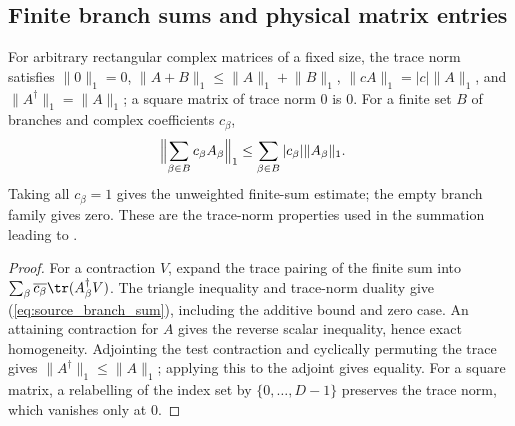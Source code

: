 \subsection{Finite branch sums and physical matrix entries}

\begin{theorem}
    \label{thm:source_branch_sum}
    \leanok
    For arbitrary rectangular complex matrices of a fixed size, the
    trace norm satisfies $\lVert0\rVert_1=0$,
    $\lVert A+B\rVert_1\leq\lVert A\rVert_1+\lVert B\rVert_1$,
    $\lVert cA\rVert_1=|c|\lVert A\rVert_1$, and
    $\lVert A^\dagger\rVert_1=\lVert A\rVert_1$; a square matrix of trace norm $0$ is $0$.
    For a finite set $B$ of branches and complex coefficients $c_\beta$,
    \begin{align}
        \Bigl\lVert\sum_{\beta\in B}c_\beta A_\beta\Bigr\rVert_1
         & \leq\sum_{\beta\in B}|c_\beta|\lVert A_\beta\rVert_1.
        \label{eq:source_branch_sum}
    \end{align}
    Taking all $c_\beta=1$ gives the unweighted finite-sum estimate; the
    empty branch family gives zero.
    These are the trace-norm properties used in the summation leading to
    \cite[Equation~(5.19)]{OpenAI2026PolynomialPEPS}.
\end{theorem}

\begin{proof}\leanok
    For a contraction $V$, expand the trace pairing of the finite sum
    into $\sum_\beta\overline{c_\beta}\tr(A_\beta^\dagger V)$.
    The triangle inequality and trace-norm duality give
    (\ref{eq:source_branch_sum}), including the additive bound and zero
    case. An attaining contraction for $A$ gives the reverse scalar
    inequality, hence exact homogeneity. Adjointing the test contraction
    and cyclically permuting the trace gives
    $\lVert A^\dagger\rVert_1\leq\lVert A\rVert_1$; applying this to the
    adjoint gives equality. For a square matrix, a relabelling of the index set
    by $\{0,\dots,D-1\}$ preserves the trace norm, which vanishes only at $0$.
\end{proof}


